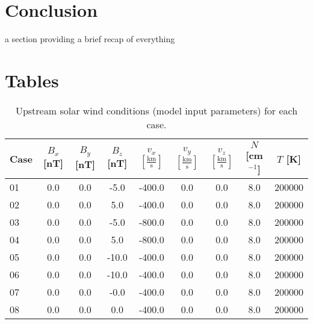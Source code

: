 \documentclass[12pt, letterpaper]{article}
\begin{document}
\section{Conclusion}
\label{sec:5}
a section providing a brief recap of everything

\appendix
\section{Tables}
\label{sec:A}
\renewcommand{\arraystretch}{1.5}
\begin{table}[!ht]
\centering
\label{Table 1}
\caption{Upstream solar wind conditions (model input parameters) for each case.}
\begin{tabular}{l c c c c c c c c} %
\hline
\rule{0pt}{4.5mm}
\vspace{1mm}
Case & $B_{x}$ [nT] & $B_{y}$ [nT] & $B_{z}$ [nT] & $v_{x}$ $\left[ \frac{\text{km}}{\text{s}} \right]$ & $v_{y}$ $\left[ \frac{\text{km}}{\text{s}} \right]$ & $v_{z}$ $\left[ \frac{\text{km}}{\text{s}} \right]$ & $N$ [cm$^{-1}$] & $T$ [K] \\
\hline
\hline
01 & 0.0 & 0.0 & -5.0 & -400.0 & 0.0 & 0.0 & 8.0 & 200000 \\
02 & 0.0 & 0.0 & 5.0 & -400.0 & 0.0 & 0.0 & 8.0 & 200000 \\
03 & 0.0 & 0.0 & -5.0 & -800.0 & 0.0 & 0.0 & 8.0 & 200000 \\
04 & 0.0 & 0.0 & 5.0 & -800.0 & 0.0 & 0.0 & 8.0 & 200000 \\
05 & 0.0 & 0.0 & -10.0 & -400.0 & 0.0 & 0.0 & 8.0 & 200000 \\
06 & 0.0 & 0.0 & -10.0 & -400.0 & 0.0 & 0.0 & 8.0 & 200000 \\
07 & 0.0 & 0.0 & -0.0 & -400.0 & 0.0 & 0.0 & 8.0 & 200000 \\
08 & 0.0 & 0.0 & 0.0 & -400.0 & 0.0 & 0.0 & 8.0 & 200000 \\
\hline
\end{tabular}
\end{table}
\end{document}
